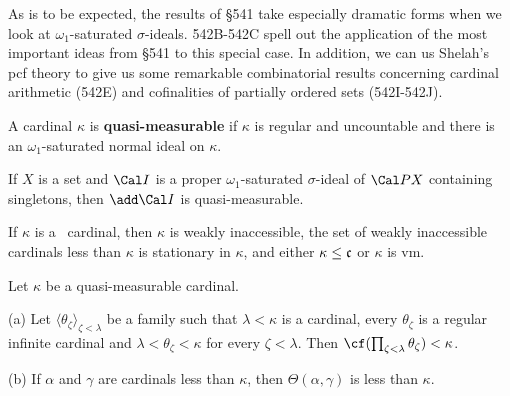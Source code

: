 
\def\chaptername{Real-valued-measurable cardinals}
\def\sectionname{Quasi-measurable cardinals}


As is to be expected, the results of \S541 take especially dramatic
forms when we look at $\omega_1$-saturated $\sigma$-ideals.   542B-542C
spell out the application of the most important ideas from \S541 to this
special case.   In addition, we can us Shelah's pcf theory to give us
some remarkable combinatorial results concerning cardinal arithmetic
(542E) and cofinalities of partially ordered sets (542I-542J).

 A cardinal $\kappa$ is {\bf quasi-measurable}
if $\kappa$ is regular and uncountable and there is an
$\omega_1$-saturated normal ideal on $\kappa$.

 If $X$ is a set and $\Cal I$ is a proper
$\omega_1$-saturated $\sigma$-ideal of $\Cal PX$ containing singletons,
then $\add\Cal I$ is quasi-measurable.


 If $\kappa$ is a \qm\ cardinal, then $\kappa$
is weakly inaccessible, the set of weakly inaccessible cardinals less
than $\kappa$ is stationary in $\kappa$, and either
$\kappa\le\frak c$ or $\kappa$ is \2vm.


Let $\kappa$ be a quasi-measurable cardinal.

(a) Let $\langle\theta_{\zeta}\rangle_{\zeta<\lambda}$ be a family
such that $\lambda<\kappa$ is a cardinal, every $\theta_{\zeta}$
is a regular infinite cardinal and
$\lambda<\theta_{\zeta}<\kappa$ for every $\zeta<\lambda$.   Then
$\cf(\prod_{\zeta<\lambda}\theta_{\zeta})<\kappa$.

(b) If $\alpha$ and $\gamma$ are cardinals less than $\kappa$, then
$\Theta(\alpha,\gamma)$ is less than
$\kappa$.

